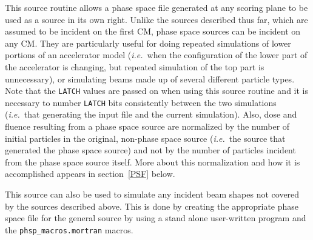 \documentclass[12pt,twoside]{article}
\newcommand{\ie}{{\em i.e.}}
\begin{document}
This source routine allows a phase space file generated at any scoring
plane to be used as a source in its own right.  Unlike the sources
described thus far, which are assumed to be
incident on the first CM, phase space
sources can be incident on any CM.  They are particularly useful for
doing repeated simulations of lower portions of an accelerator model (\ie\
when the configuration of the lower part of the accelerator is changing,
but repeated simulation of the top part is unnecessary), or simulating
beams made up of several different particle types.
Note that the
\verb+LATCH+ values are passed on when using this source routine and it
is necessary to number \verb+LATCH+ bits consistently between the two
simulations (\ie\ that generating the input file and the current
simulation).  Also, dose and fluence resulting from a phase space source
are normalized by the number of initial particles in the original, non-phase
space source (\ie\ the source that generated the phase space source) and not
by the number of particles incident from the phase space source itself.  More
about this normalization and how it is accomplished appears in section~\ref{PSF} below.
\index{LATCH!in ISOURC=21}

This source can also be used to simulate any incident beam shapes not
covered by the sources described above.  This is done by creating the
appropriate phase space file for the general source by using a stand alone
user-written program and the \verb+phsp_macros.mortran+ macros.
\end{document}
